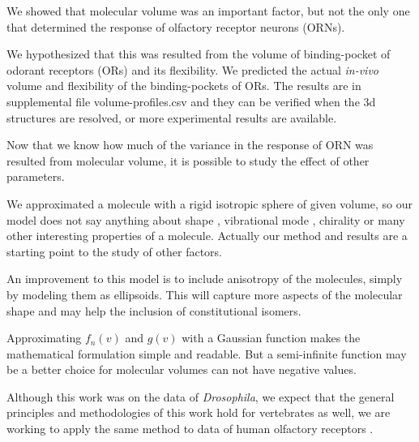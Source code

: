 \documentclass[fleqn,10pt]{wlscirep} %
\begin{document}
We showed that molecular volume was an important factor, 
but not the only one that determined the response of olfactory receptor neurons (ORNs). 

We hypothesized that this was resulted from the volume of binding-pocket of odorant receptors (ORs) and its flexibility. 
We predicted the actual \textit{in-vivo} volume and flexibility of the binding-pockets of ORs. 
The results are in supplemental file volume-profiles.csv and they can be verified when the 3d structures are resolved, 
or more experimental results are available. 

Now that we know how much of the variance in the response of ORN was resulted from molecular volume, 
it is possible to study the effect of other parameters.

We approximated a molecule with a rigid isotropic sphere of given volume, 
so our model does not say anything about shape \cite{Keller2004, Araneda2000, uchida2000}, 
vibrational mode \cite{Turin,Franco2011,turin2015plausibility}, 
chirality \cite{tirandaz2015dissipative} or many other interesting properties of a molecule.
Actually our method and results are a starting point to the study of other factors. 

An improvement to this model is to include anisotropy of the molecules, 
simply by modeling  them as ellipsoids. 
This will capture more aspects of the molecular shape and may help the inclusion of constitutional isomers. 

Approximating $f_n(v)$ and $g(v)$ with a Gaussian function makes the mathematical formulation simple and readable. 
But a semi-infinite function may be a better choice for molecular volumes can not have negative values.

Although this work was on the data of \textit{Drosophila}, 
we expect that the general principles and methodologies of this work hold for vertebrates as well, 
we are working to apply the same method to data of human olfactory receptors \cite{mainland2015human}.

\end{document}
